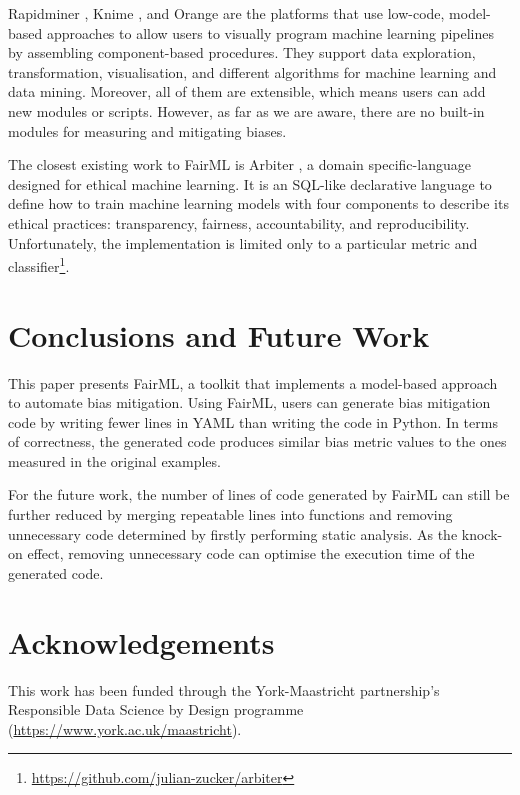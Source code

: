 \documentclass[sigconf,review]{acmart}
\begin{document}
{	Rapidminer \cite{hofmann2016rapidminer}, Knime \cite{berthold2008knime}, and Orange \cite{demsar2013orange} are the platforms that use low-code, model-based approaches to allow users to visually program machine learning pipelines by assembling component-based procedures. They support data exploration, transformation, visualisation, and different algorithms for machine learning and data mining. Moreover, all of them are extensible, which means users can add new modules or scripts. However, as far as we are aware, there are no built-in modules for measuring and mitigating biases. 
	
	The closest existing work to FairML is Arbiter \cite{zucker2020arbiter}, a domain specific-language designed for ethical machine learning. It is an SQL-like declarative language to define how to train machine learning models with four components to describe its ethical practices: transparency, fairness, accountability, and reproducibility. Unfortunately, the implementation is limited only to a particular metric and classifier\footnote{\url{https://github.com/julian-zucker/arbiter}}.
	
	\section{Conclusions and Future Work}
	\label{sec:conclusions_and_future_work}
	This paper presents FairML, a toolkit that implements a model-based approach to automate bias mitigation. Using FairML, users can generate bias mitigation code by writing fewer lines in YAML than writing the code in Python.
	In terms of correctness, the generated code produces similar bias metric values to the ones measured in the original examples.
	
	For the future work, the number of lines of code generated by FairML can still be further reduced by merging repeatable lines into functions and removing unnecessary code determined by firstly performing static analysis. 
	As the knock-on effect, removing unnecessary code can optimise the execution time of the generated code.
	
	
	\section{Acknowledgements}
	\label{sec:acknowledgements}
	This work has been funded through the York-Maastricht
	partnership's Responsible Data Science by Design programme
	(\url{https://www.york.ac.uk/maastricht}).
	
}
\end{document}
